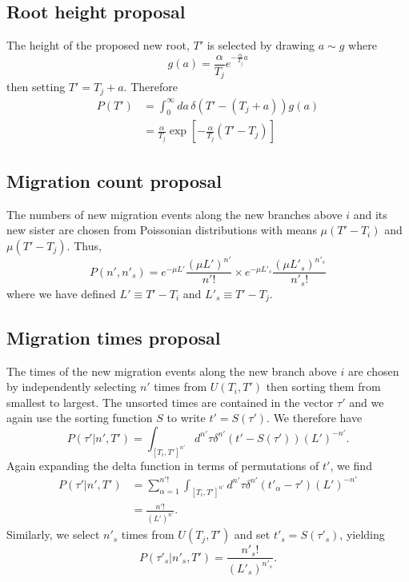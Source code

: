\documentclass[a4paper,11pt]{article}
\begin{document}
\subsection{Root height proposal}

The height of the proposed new root, $T'$ is selected by drawing
$a\sim g$ where
\begin{equation}
g(a)=\frac{\alpha}{T_j}e^{-\frac{\alpha}{T_j}a}
\end{equation}
then setting $T'=T_j+a$. Therefore
\begin{align}
  P(T')&=\int_0^\infty da\, \delta(T'-(T_j+a))g(a)\nonumber\\
&=\frac{\alpha}{T_j}\exp[-\frac{\alpha}{T_j}(T'-T_j)]
\end{align}

\subsection{Migration count proposal}

The numbers of new migration events along the new branches above $i$
and its new sister are chosen from Poissonian distributions with means
$\mu(T'-T_i)$ and $\mu(T'-T_j)$.  Thus,
\begin{equation}
  P(n',n'_s)=e^{-\mu L'}\frac{(\mu L')^{n'}}{n'!}
  \times e^{-\mu L'_s}\frac{(\mu L'_s)^{n'_s}}{n'_s!}
\end{equation}
where we have defined $L'\equiv T'-T_i$ and $L'_s\equiv T'-T_j$.

\subsection{Migration times proposal}

The times of the new migration events along the new branch above $i$
are chosen by independently selecting $n'$ times from $U(T_i,T')$ then
sorting them from smallest to largest.  The unsorted times are
contained in the vector $\tau'$ and we again use the sorting function
$S$ to write $t'=S(\tau')$.  We therefore have
\begin{equation}
  P(\tau'|n',T')=\int_{[T_i,T']^{n'}}d^{n'}\tau\delta^{n'}(t'-S(\tau'))(L')^{-n'}.
\end{equation}
Again expanding the delta function in terms of permutations of $t'$,
we find
\begin{align}
P(\tau'|n',T')&=\sum_{\alpha=1}^{n'!}\int_{[T_i,T']^{n'}}d^{n'}\tau\delta^{n'}(t'_\alpha-\tau')(L')^{-n'}\nonumber\\
&=\frac{n'!}{(L')^{n'}}.
\end{align}
Similarly, we select $n'_s$ times from $U(T_j,T')$ and set
$t'_s=S(\tau'_s)$, yielding
\begin{equation}
  P(\tau'_s|n'_s,T')=\frac{n'_s!}{(L'_s)^{n'_s}}.
\end{equation}
\end{document}

